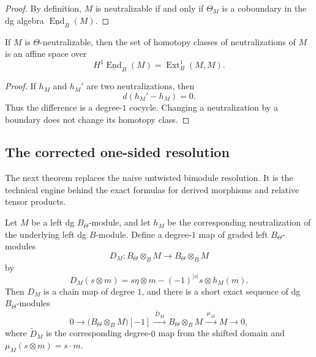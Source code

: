 \begin{proof}
By definition, \(M\) is neutralizable if and only if \(\Theta_{M}\) is a coboundary in the dg algebra \(\underline{\operatorname{End}}_{B}(M)\).
\end{proof}

\begin{corollary}
\label{cor:tholog-moduli-neutralizations}
If \(M\) is \(\Theta\)-neutralizable, then the set of homotopy classes of neutralizations of \(M\) is an affine space over
\[
H^{1}\underline{\operatorname{End}}_{B}(M)
=\operatorname{Ext}^{1}_{B}(M,M).
\]
\end{corollary}

\begin{proof}
If \(h_{M}\) and \(h_{M}'\) are two neutralizations, then
\[
d(h_{M}'-h_{M})=0.
\]
Thus the difference is a degree-\(1\) cocycle.
Changing a neutralization by a boundary does not change its homotopy class.
\end{proof}

\subsection{The corrected one-sided resolution}
\label{subsec:tholog-corrected-one-sided-resolution}

The next theorem replaces the naive untwisted bimodule resolution.
It is the technical engine behind the exact formulas for derived morphisms and relative tensor products.

\begin{theorem}
\label{thm:tholog-free-two-term-resolution}
Let \(M\) be a left dg \(B_{\Theta}\)-module, and let \(h_{M}\) be the corresponding neutralization of the underlying left dg \(B\)-module.
Define a degree-\(1\) map of graded left \(B_{\Theta}\)-modules
\[
D_{M}:B_{\Theta}\otimes_{B} M\longrightarrow B_{\Theta}\otimes_{B} M
\]
by
\[
D_{M}(s\otimes m)=s\eta\otimes m-(-1)^{|s|}s\otimes h_{M}(m).
\]
Then \(D_{M}\) is a chain map of degree \(1\), and there is a short exact sequence of dg \(B_{\Theta}\)-modules
\[
0\longrightarrow \big(B_{\Theta}\otimes_{B}M\big)[-1]
\xrightarrow{\;\widetilde D_{M}\;}
B_{\Theta}\otimes_{B}M
\xrightarrow{\;\mu_{M}\;}
M
\longrightarrow 0,
\]
where \(\widetilde D_{M}\) is the corresponding degree-\(0\) map from the shifted domain and \(\mu_{M}(s\otimes m)=s\cdot m\).
\end{theorem}

